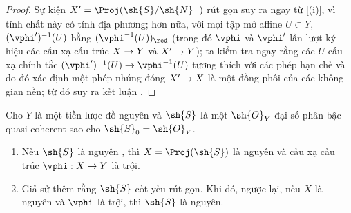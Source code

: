 \documentclass[oneside,10pt]{amsart}
\makeatletter
\newcommand{\ega@arrow}[2]{\mathchoice{#1}{#2}{#2}{#2}}
\renewcommand{\to}{\ega@arrow{\longrightarrow}{\rightarrow}}
\let\EGAOriginalLabel\label
\renewcommand{\label}[1]{\phantomsection\EGAOriginalLabel{#1}}
\makeatother
\begin{document}
\begin{proof}
Sự kiện $X'=\Proj(\sh{S}/\sh{N}_+)$ rút gọn suy ra ngay từ [(i)], vì tính chất này có tính địa phương;
hơn nữa, với mọi tập mở affine $U\subset Y$, $(\vphi')^{-1}(U)$ bằng $(\vphi^{-1}(U))_\red$ (trong đó $\vphi$ và $\vphi'$ lần lượt ký hiệu các cấu xạ cấu trúc $X\to Y$ và $X'\to Y$);
ta kiểm tra ngay rằng các $U$-cấu xạ chính tắc $(\vphi')^{-1}(U)\to\vphi^{-1}(U)$ tương thích với các phép hạn chế và do đó xác định một phép nhúng đóng $X'\to X$ là một đồng phôi của các không gian nền;
từ đó suy ra kết luận .
\end{proof}

\begin{proposition}[3.1.14]
\label{II.3.1.14}
Cho $Y$ là một tiền lược đồ nguyên và $\sh{S}$ là một $\sh{O}_Y$-đại số phân bậc quasi-coherent sao cho $\sh{S}_0=\sh{O}_Y$.
\begin{enumerate}
  \item[(i)] Nếu $\sh{S}$ là nguyên , thì $X=\Proj(\sh{S})$ là nguyên và cấu xạ cấu trúc $\vphi:X\to Y$ là trội.
  \item[(ii)] Giả sử thêm rằng $\sh{S}$ cốt yếu rút gọn.
    Khi đó, ngược lại, nếu $X$ là nguyên và $\vphi$ là trội, thì $\sh{S}$ là nguyên.
\end{enumerate}
\end{proposition}
\end{document}
